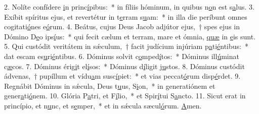 2. Nolíte confídere \uline{i}n princ\uline{í}pibus:~* in fíliis hóminum, in quibus n\uline{o}n est s\uline{a}lus.
3. Exíbit spíritus ejus, et revertétur in t\uline{e}rram s\uline{u}am:~* in illa die períbunt omnes cogitati\uline{ó}nes e\uline{ó}rum.
4. Beátus, cujus Deus Jacob adjútor ejus,~† spes ejus in Dómino D\uline{e}o ips\uline{í}us:~* qui fecit cælum et terram, mare et ómnia, \uline{quæ} in \uline{e}is sunt.
5. Qui custódit veritátem in sǽculum,~† facit judícium injúriam p\uline{a}ti\uline{é}ntibus:~* dat escam es\uline{u}ri\uline{é}ntibus.
6. Dóminus solvit c\uline{o}mped\uline{í}tos:~* Dóminus ill\uline{ú}minat c\uline{æ}cos.
7. Dóminus érig\uline{i}t el\uline{í}sos:~* Dóminus d\uline{í}ligit j\uline{u}stos.
8. Dóminus custódit ádvenas,~† pupíllum et vídu\uline{a}m susc\uline{í}piet:~* et vias peccat\uline{ó}rum disp\uline{é}rdet.
9. Regnábit Dóminus in sǽcula, Deus t\uline{u}us, S\uline{i}on,~* in generatiónem et gener\uline{a}ti\uline{ó}nem.
10. Glória P\uline{a}tri, et F\uline{í}lio,~* et Spir\uline{í}tui S\uline{a}ncto.
11. Sicut erat in princípio, et n\uline{u}nc, et s\uline{e}mper,~* et in sǽcula sæcul\uline{ó}rum. \uline{A}men.

